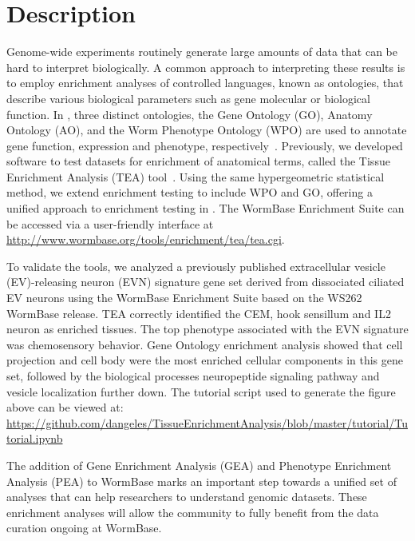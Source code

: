 \section{Description}
Genome-wide experiments routinely generate large amounts of data that can be
hard to interpret biologically. A common approach to interpreting these results
is to employ enrichment analyses of controlled languages, known as ontologies,
that describe various biological parameters such as gene molecular or biological
function. In \cel{}, three distinct ontologies, the Gene Ontology (GO),
Anatomy Ontology (AO), and the Worm Phenotype Ontology (WPO) are used to
annotate gene function, expression and phenotype,
respectively~\citep{TheGeneOntologyConsortium2000a,Lee2003,Schindelman2011}.
Previously, we developed software to test datasets for enrichment of anatomical
terms, called the Tissue Enrichment Analysis (TEA)
tool~\citep{Angeles-Albores2016}. Using the same hypergeometric statistical
method, we extend enrichment testing to include WPO and GO, offering a unified
approach to enrichment testing in \cel{}. The WormBase Enrichment Suite can
be accessed via a user-friendly interface at
\url{http://www.wormbase.org/tools/enrichment/tea/tea.cgi}.

To validate the tools, we analyzed a previously published extracellular vesicle
(EV)-releasing neuron (EVN) signature gene set derived from dissociated ciliated
EV neurons\citep{Wang2015} using the WormBase Enrichment Suite based on the
WS262 WormBase release. TEA correctly identified the CEM, hook sensillum and IL2
neuron as enriched tissues. The top phenotype associated with the EVN signature
was chemosensory behavior. Gene Ontology enrichment analysis showed that cell
projection and cell body were the most enriched cellular components in this gene
set, followed by the biological processes neuropeptide signaling pathway and
vesicle localization further down. The tutorial script used to generate the
figure above can be viewed at:
\url{https://github.com/dangeles/TissueEnrichmentAnalysis/blob/master/tutorial/Tutorial.ipynb}

The addition of Gene Enrichment Analysis (GEA) and Phenotype Enrichment Analysis
(PEA) to WormBase marks an important step towards a unified set of analyses that
can help researchers to understand genomic datasets. These enrichment analyses
will allow the community to fully benefit from the data curation ongoing at
WormBase.


